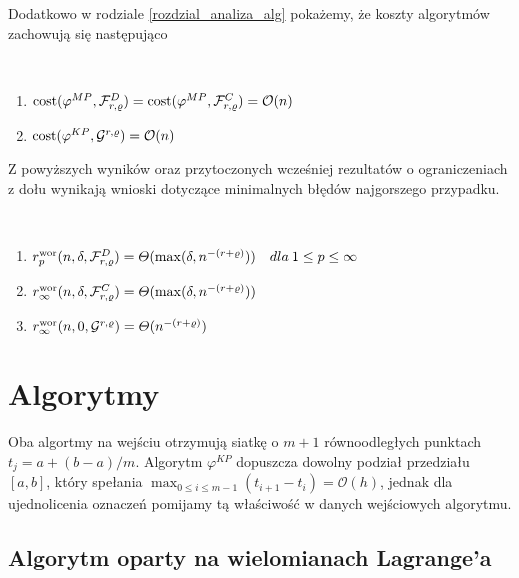 \documentclass[oik, pdftex, robocza, man]{mgrwms}
\begin{document}
    Dodatkowo w rodziale \ref{rozdzial_analiza_alg} pokażemy, że koszty algorytmów zachowują się następująco

    \begin{stw}~%
        \begin{enumerate}
            \item $\mathrm{cost}(\varphi^{MP}, \mathcal{F}_{r,\varrho}^{D}) = \mathrm{cost}(\varphi^{MP}, \mathcal{F}_{r,\varrho}^{C}) = \mathcal{O}(n)$
            \item $\mathrm{cost}(\varphi^{KP}, \mathcal{G}^{r,\varrho}) = \mathcal{O}(n)$
        \end{enumerate}
    \end{stw}

    Z powyższych wyników oraz przytoczonych wcześniej rezultatów o ograniczeniach z dołu wynikają wnioski dotyczące minimalnych błędów najgorszego przypadku.

    \begin{cor}~
        \begin{enumerate}[label=(\roman*)]
            \item $r^{\mathrm{wor}}_{p}(n, \delta, \mathcal{F}^{D}_{r,\varrho}) = \varTheta(\max(\delta, n^{-(r+\varrho)})) \quad dla \: 1 \leq p \leq \infty$
            \item $r^{\mathrm{wor}}_{\infty}(n, \delta, \mathcal{F}^{C}_{r,\varrho}) = \varTheta(\max(\delta, n^{-(r+\varrho)}))$
            \item $r^{\mathrm{wor}}_{\infty}(n, 0, \mathcal{G}^{r,\varrho}) = \varTheta(n^{-(r+\varrho)})$
        \end{enumerate}
    \end{cor}
    
\mgrclosechapter


\chapter{Algorytmy}

    Oba algortmy na wejściu otrzymują siatkę o $m+1$ równoodległych punktach $t_{j} = a+(b-a) / m$. Algorytm $\varphi^{KP}$ dopuszcza dowolny podział przedziału $[a,b]$, który spełania $\max_{0\leq i \leq m-1} (t_{i+1}-t_{i}) = \mathcal{O}(h)$, jednak dla ujednolicenia oznaczeń pomijamy tą właściwość w danych wejściowych algorytmu.

\section{Algorytm oparty na wielomianach Lagrange'a}
\end{document}
